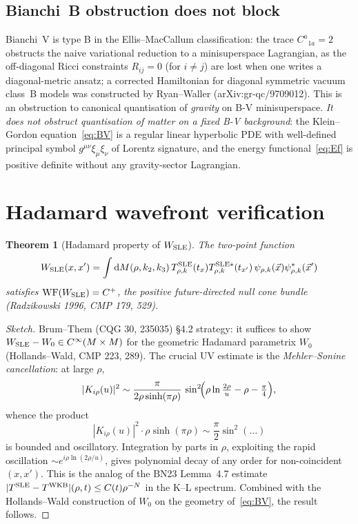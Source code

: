 \documentclass[11pt,a4paper]{article}
\newtheorem{theorem}{Theorem}
\theoremstyle{definition}
\newcommand{\dd}{\mathrm{d}}
\begin{document}
\subsection{Bianchi~B obstruction does not block}

Bianchi~V is type B in the Ellis--MacCallum classification: the trace
$C^a{}_{1a} = 2$ obstructs the naive variational reduction to a
minisuperspace Lagrangian, as the off-diagonal Ricci constraints
$R_{ij} = 0$ (for $i \neq j$) are lost when one writes a diagonal-metric
ansatz; a corrected Hamiltonian for diagonal symmetric vacuum class~B
models was constructed by Ryan--Waller (arXiv:gr-qc/9709012). This is
an obstruction to canonical quantisation of \emph{gravity} on B-V
minisuperspace. \emph{It does not
obstruct quantisation of matter on a fixed B-V background}: the
Klein--Gordon equation~\eqref{eq:BV} is a regular linear hyperbolic PDE
with well-defined principal symbol $g^{\mu\nu} \xi_\mu \xi_\nu$ of
Lorentz signature, and the energy functional~\eqref{eq:Ef} is positive
definite without any gravity-sector Lagrangian.

\section{Hadamard wavefront verification}

\begin{theorem}[Hadamard property of $W_{\rm SLE}$]
\label{thm:Hadamard}
The two-point function
\begin{equation}
W_{\rm SLE}(x, x') = \int \dd M(\rho, k_2, k_3)\,
T^{\rm SLE}_{\rho,k}(t_x) T^{{\rm SLE}*}_{\rho,k}(t_{x'})\,
\psi_{\rho,k}(\vec{x}) \psi_{\rho,k}^*(\vec{x}')
\end{equation}
satisfies $\mathrm{WF}(W_{\rm SLE}) = C^+$, the positive future-directed
null cone bundle (Radzikowski 1996, CMP 179, 529).
\end{theorem}

\begin{proof}[Sketch]
Brum--Them (CQG 30, 235035) \S4.2 strategy: it suffices to show
$W_{\rm SLE} - W_0 \in C^\infty(M \times M)$ for the geometric Hadamard
parametrix $W_0$ (Hollands--Wald, CMP 223, 289). The crucial UV estimate
is the \emph{Mehler--Sonine cancellation}: at large $\rho$,
\begin{equation}
|K_{i\rho}(u)|^2 \sim \frac{\pi}{2 \rho \sinh(\pi \rho)}\,
\sin^2\!\Bigl(\rho \ln \tfrac{2\rho}{u} - \rho - \tfrac{\pi}{4}\Bigr),
\end{equation}
whence the product
\begin{equation}
|K_{i\rho}(u)|^2 \cdot \rho \sinh(\pi \rho) \sim \frac{\pi}{2} \sin^2(\dots)
\end{equation}
is bounded and oscillatory. Integration by parts in $\rho$, exploiting
the rapid oscillation $\sim e^{i \rho \ln(2\rho/u)}$, gives polynomial
decay of any order for non-coincident $(x, x')$. This is the analog of
the BN23 Lemma~4.7 estimate $|T^{\rm SLE} - T^{\rm WKB}|(\rho, t) \leq
C(t) \rho^{-N}$ in the K--L spectrum. Combined with the Hollands--Wald
construction of $W_0$ on the geometry of~\eqref{eq:BV}, the result
follows.
\end{proof}
\end{document}
